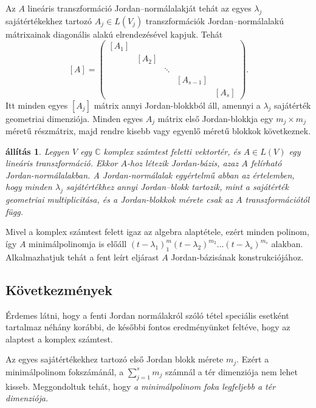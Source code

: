 \documentclass[9pt, a4paper, showtrims]{memoir}
\makeatletter
\renewenvironment{proof}[1][\proofname]
    {\par\pushQED{\qed}%
    \normalfont \topsep6\p@\@plus6\p@\relax
    \trivlist
    \item[\hskip\labelsep
        \itshape
    #1\@addpunct{:}]\ignorespaces}
    {\popQED\endtrivlist\@endpefalse}
\theoremstyle{plain}
\newtheorem{proposition}{állítás}[chapter]
\theoremstyle{remark}
\theoremstyle{definition}
\makeatother
\begin{document}
Az $A$ lineáris transzformáció Jordan--normálalakját tehát az egyes $\lambda_j$ sajátértékekhez tartozó $A_j\in L\left( V_j \right)$
transzformációk Jordan--normálalakú mátrixainak diagonális alakú elrendezésével kapjuk.
Tehát
\[
    [A]
    =
    \begin{pmatrix}
        [A_1]&&&&\\
        &\!\!\![A_2]&&&\\
        &\!\!\!&\ddots&&\\
        &\!\!\!&&\!\!\![A_{s-1}]&\\
        &\!\!\!&&\!\!\!&\!\!\![A_s]
    \end{pmatrix}.
\]
Itt minden egyes $[A_j]$ mátrix annyi Jordan-blokkból áll,
amennyi a $\lambda_j$ sajátérték geometriai dimenziója.
Minden egyes $A_j$ mátrix első Jordan-blokkja
egy $m_j\times m_j$ méretű részmátrix, 
majd rendre kisebb vagy egyenlő méretű blokkok következnek.
\begin{proposition}
    Legyen $V$ egy $\mathbb{C}$ komplex számtest feletti vektortér,
    és $A\in L\left( V \right)$ egy lineáris transzformáció.
    Ekkor $A$-hoz létezik Jordan-bázis, azaz $A$ felírható Jordan-normálalakban.
    A Jordan-normálalak egyértelmű abban az értelemben,
    hogy minden $\lambda_j$ sajátértékhez annyi Jordan--blokk tartozik, mint
    a sajátérték geometriai multiplicitása, és a Jordan-blokkok mérete csak az $A$ transzformációtól függ.
\end{proposition}
\begin{proof}
    Mivel a komplex számtest felett igaz az algebra alaptétele,
    ezért minden polinom, így $A$ minimálpolinomja is előáll
    $\left( t-\lambda_1 \right)^m_1\left( t-\lambda_2 \right)^{m_2}\dots\left( t-\lambda_s \right)^{m_s}$
    alakban.
    Alkalmazhatjuk tehát a fent leírt eljárast $A$ Jordan-bázisának konstrukciójához.
\end{proof}

\subsection{Következmények}
Érdemes látni,
hogy a fenti Jordan normálakról szóló tétel speciális esetként tartalmaz néhány korábbi, 
de későbbi fontos eredményünket feltéve, hogy az alaptest a komplex számtest.

Az egyes sajátértékekhez tartozó első Jordan blokk mérete $m_j$.
Ezért a minimálpolinom fokszámánál, a $\sum_{j=1}^sm_j$ számnál a tér dimenziója nem lehet kisseb.
Meggondoltuk tehát, hogy \emph{a minimálpolinom foka legfeljebb  a tér dimenziója.}
\end{document}
